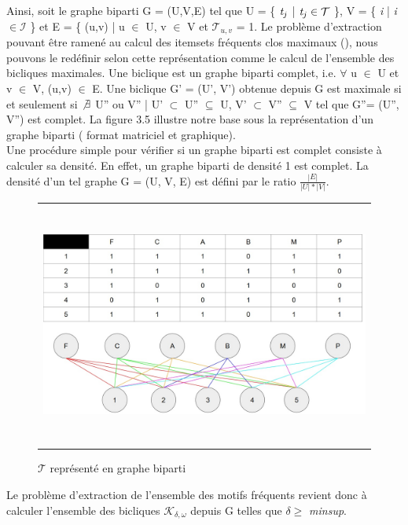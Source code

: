 \documentclass[a4paper,10pt]{report}
\begin{document}
	Ainsi, soit le graphe biparti G = (U,V,E) tel que U = \{ $\emph{t}_{j}$ | $\emph{t}_{j} \in \mathcal{T}$ \}, V = \{ \emph{i} | \emph{i} $\in \mathcal{I}$ \} et E = \{ (u,v) | u $\in$ U, v $\in$ V et $\mathcal{T}_{u,v}$ = 1. Le problème d'extraction pouvant être ramené au calcul des itemsets fréquents clos maximaux (\cite{ZAK00}), nous pouvons le redéfinir selon cette représentation comme le calcul de l'ensemble des bicliques maximales. Une biclique est un graphe biparti complet, i.e. $\forall$ u $\in$ U et v $\in$ V, (u,v) $\in$ E. Une biclique G' = (U', V') obtenue depuis G est maximale si et seulement si $\not\exists$ U'' ou V'' | U' $\subset$ U'' $\subseteq$ U, V' $\subset$ V'' $\subseteq$ V tel que G''= (U'', V'') est complet. La figure 3.5 illustre notre base sous la représentation d'un graphe biparti ( format matriciel et graphique).\\
	
	Une procédure simple pour vérifier si un graphe biparti est complet consiste à calculer sa densité. En effet, un graphe biparti de densité 1 est complet. La densité d'un tel graphe G = (U, V, E) est défini par le ratio $\frac{|E|}{|U|*|V|}$. \\
	
\begin{figure}
	\begin{adjustwidth}{-1cm}{}
	\begin{tabular}{l}
	\includegraphics[width=15cm,height=8cm]{./img/graphe_biparti}\\
	\end{tabular}
	\caption{\label{fig:text}$\mathcal{T}$ représenté en graphe biparti}
	\end{adjustwidth}
\end{figure}

Le problème d'extraction de l'ensemble des motifs fréquents revient donc à calculer l'ensemble des bicliques $\mathcal{K}_{\delta, \omega}$ depuis G telles que $\delta \geq$ \emph{minsup}.




\end{document}
